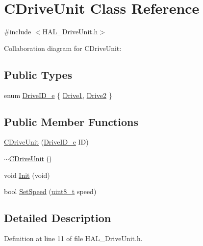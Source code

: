 \hypertarget{class_c_drive_unit}{}\section{C\+Drive\+Unit Class Reference}
\label{class_c_drive_unit}


{\ttfamily \#include $<$H\+A\+L\+\_\+\+Drive\+Unit.\+h$>$}



Collaboration diagram for C\+Drive\+Unit\+:
\subsection*{Public Types}
\begin{DoxyCompactItemize}
\item 
enum \mbox{\hyperlink{class_c_drive_unit_a4edb3384824cee71b23c42025b689d4e}{Drive\+I\+D\+\_\+e}} \{ \mbox{\hyperlink{class_c_drive_unit_a4edb3384824cee71b23c42025b689d4ea5069438f822a5eb645aa78d8e4b461dd}{Drive1}}, 
\mbox{\hyperlink{class_c_drive_unit_a4edb3384824cee71b23c42025b689d4eaf18a8a2892d6497a0d3697e22848dfe0}{Drive2}}
 \}
\end{DoxyCompactItemize}
\subsection*{Public Member Functions}
\begin{DoxyCompactItemize}
\item 
\mbox{\hyperlink{class_c_drive_unit_aee1e28a6ee6956b8b2a01f09cfc102ee}{C\+Drive\+Unit}} (\mbox{\hyperlink{class_c_drive_unit_a4edb3384824cee71b23c42025b689d4e}{Drive\+I\+D\+\_\+e}} ID)
\item 
\mbox{\hyperlink{class_c_drive_unit_add2dcafc20d8e30ddc8ee2affb5085ee}{$\sim$\+C\+Drive\+Unit}} ()
\item 
void \mbox{\hyperlink{class_c_drive_unit_ab7b775c0f68db1490ecf8a726dbe786d}{Init}} (void)
\item 
bool \mbox{\hyperlink{class_c_drive_unit_a06ffeb71565bc8edabadae09157c705e}{Set\+Speed}} (\mbox{\hyperlink{_a_d_a_s___types_8h_aba7bc1797add20fe3efdf37ced1182c5}{uint8\+\_\+t}} speed)
\end{DoxyCompactItemize}


\subsection{Detailed Description}


Definition at line 11 of file H\+A\+L\+\_\+\+Drive\+Unit.\+h.



